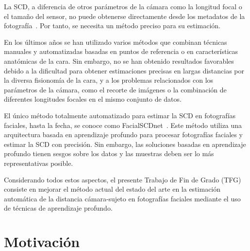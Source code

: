 La SCD, a diferencia de otros parámetros de la cámara como la longitud focal o el tamaño del sensor, no puede obtenerse directamente desde los metadatos de la fotografía~\cite{8}. Por tanto, se necesita un método preciso para su estimación. 


En los últimos años se han utilizado varios métodos que combinan técnicas manuales y automatizadas basadas en puntos de referencia o en características anatómicas de la cara\cite{28,30}. Sin embargo, no se han obtenido resultados favorables debido a la dificultad para obtener estimaciones precisas en largas distancias por la diversa fisionomía de la cara, y a los problemas relacionados con los parámetros de la cámara, como el recorte de imágenes o la combinación de diferentes longitudes focales en el mismo conjunto de datos.

El único método totalmente automatizado para estimar la SCD en fotografías faciales, hasta la fecha, se conoce como FacialSCDnet~\cite{14}. Este método utiliza una arquitectura basada en aprendizaje profundo para procesar fotografías faciales y estimar la SCD con precisión. Sin embargo, las soluciones basadas en aprendizaje profundo tienen sesgos sobre los datos y las muestras deben ser lo más representativas posible. 

Considerando todos estos aspectos, el presente Trabajo de Fin de Grado (TFG) consiste en mejorar el método actual del estado del arte en la estimación automática de la distancia cámara-sujeto en fotografías faciales mediante el uso de técnicas de aprendizaje profundo.


\section{Motivación}

